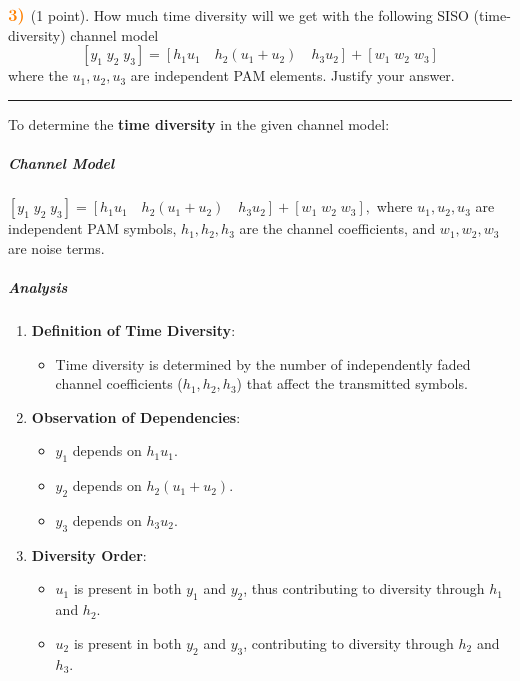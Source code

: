\documentclass[11pt]{article}
\providecommand{\tightlist}{%
      \setlength{\itemsep}{0pt}\setlength{\parskip}{0pt}}
\begin{document}
    \(\color{orange} \large \textbf{3)}\) (1 point). How much time diversity
will we get with the following SISO (time-diversity) channel model
\[[y_1 \; y_2 \; y_3] = [h_1u_1 \quad h_2(u_1 + u_2) \quad h_3u_2] + [w_1 \; w_2 \; w_3]\]
where the \(u_1,u_2,u_3\) are independent PAM elements. Justify your
answer.

    \begin{center}\rule{0.5\linewidth}{0.5pt}\end{center}

To determine the \textbf{time diversity} in the given channel model:

\subparagraph{Channel Model}\label{channel-model}

\([y_1 \; y_2 \; y_3] = [h_1u_1 \quad h_2(u_1 + u_2) \quad h_3u_2] + [w_1 \; w_2 \; w_3],\)
where \(u_1, u_2, u_3\) are independent PAM symbols, \(h_1, h_2, h_3\)
are the channel coefficients, and \(w_1, w_2, w_3\) are noise terms.

\subparagraph{Analysis}\label{analysis}

\begin{enumerate}
\def\labelenumi{\arabic{enumi}.}
\tightlist
\item
  \textbf{Definition of Time Diversity}:

  \begin{itemize}
  \tightlist
  \item
    Time diversity is determined by the number of independently faded
    channel coefficients (\(h_1, h_2, h_3\)) that affect the transmitted
    symbols.
  \end{itemize}
\item
  \textbf{Observation of Dependencies}:

  \begin{itemize}
  \tightlist
  \item
    \(y_1\) depends on \(h_1u_1\).
  \item
    \(y_2\) depends on \(h_2(u_1 + u_2)\).
  \item
    \(y_3\) depends on \(h_3u_2\).
  \end{itemize}
\item
  \textbf{Diversity Order}:

  \begin{itemize}
  \tightlist
  \item
    \(u_1\) is present in both \(y_1\) and \(y_2\), thus contributing to
    diversity through \(h_1\) and \(h_2\).
  \item
    \(u_2\) is present in both \(y_2\) and \(y_3\), contributing to
    diversity through \(h_2\) and \(h_3\).
  \end{itemize}
\end{enumerate}
\end{document}
